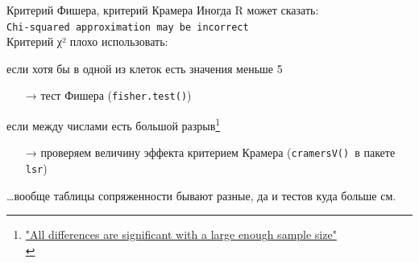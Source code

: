 \begin{frame}{Критерий Фишера, критерий Крамера}
Иногда R может сказать:\\
\scriptsize\verb"Chi-squared approximation may be incorrect"\\ \normalsize
\vfill
Критерий χ² плохо использовать:
\begin{itemize}
\mytem если хотя бы в одной из клеток есть значения меньше 5
\begin{itemize}
\item[→] тест Фишера (\scriptsize\verb"fisher.test()"\normalsize)
\end{itemize}
\mytem если между числами есть большой разрыв\footnote[frame]{\href{http://stats.stackexchange.com/a/108914}{\alert{ "All differences are significant with a large enough sample size"}\\}}
\begin{itemize}
\item[→] проверяем величину эффекта критерием Крамера (\scriptsize\verb"cramersV()"\normalsize\ в пакете \scriptsize\verb"lsr"\normalsize)
\end{itemize}
\mytem \dots вообще таблицы сопряженности бывают разные, да и тестов куда больше см.~\citep{lydersen09}
\end{itemize}
\end{frame}
